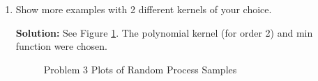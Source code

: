 \documentclass{article}[12pt]
\begin{document}
\begin{enumerate}
\begin{enumerate}
\textbf{Solution:} See Figure \ref{fig:example}. For higher values of $\tau$, the function appears smoother. 

\item Show more examples with 2 different kernels of your choice. 

\textbf{Solution:} See Figure \ref{fig:example}. The polynomial kernel (for order 2) and min function were chosen.

\begin{figure}%
    \centering
    \qquad
    \caption{Problem 3 Plots of Random Process Samples}%
    \label{fig:example}%
\end{figure}


\end{enumerate}
\end{enumerate}
\end{document}

